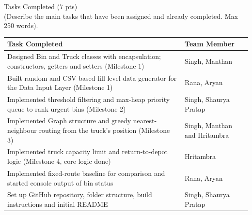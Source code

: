 \documentclass[10pt,a4paper]{article}
\newcommand{\sectionhead}[2]{%
  \needspace{8\baselineskip}
  \vspace{6pt}
  {\Large\color{headblue}#1}\\[-2pt]
  {\small\color{hintgrey}#2}\par\vspace{2pt}}
\newcommand{\hrow}{\rowcolor{tablehead}}
\begin{document}
\sectionhead{Tasks Completed (7 pts)}{(Describe the main tasks that have been assigned and already completed. Max 250 words).}
\noindent
\begin{tabularx}{\textwidth}{|X|L{0.30\textwidth}|}
\hline
\hrow \textbf{Task Completed} & \textbf{Team Member} \\ \hline
Designed Bin and Truck classes with encapsulation; constructors, getters and setters (Milestone 1) & Singh, Manthan \\ \hline
Built random and CSV-based fill-level data generator for the Data Input Layer (Milestone 1) & Rana, Aryan \\ \hline
Implemented threshold filtering and max-heap priority queue to rank urgent bins (Milestone 2) & Singh, Shaurya Pratap \\ \hline
Implemented Graph structure and greedy nearest-neighbour routing from the truck's position (Milestone 3) & Singh, Manthan and Hritambra \\ \hline
Implemented truck capacity limit and return-to-depot logic (Milestone 4, core logic done) & Hritambra \\ \hline
Implemented fixed-route baseline for comparison and started console output of bin status & Rana, Aryan \\ \hline
Set up GitHub repository, folder structure, build instructions and initial README & Singh, Shaurya Pratap \\ \hline
\end{tabularx}
\end{document}
